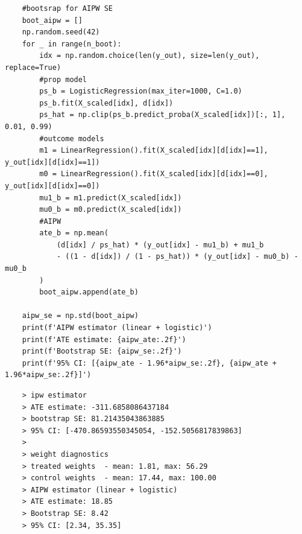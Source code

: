 \documentclass[10pt]{article}
\begin{document}
\begin{lstlisting}
    #bootsrap for AIPW SE 
    boot_aipw = []
    np.random.seed(42)
    for _ in range(n_boot):
        idx = np.random.choice(len(y_out), size=len(y_out), replace=True)
        #prop model
        ps_b = LogisticRegression(max_iter=1000, C=1.0)
        ps_b.fit(X_scaled[idx], d[idx])
        ps_hat = np.clip(ps_b.predict_proba(X_scaled[idx])[:, 1], 0.01, 0.99)
        #outcome models
        m1 = LinearRegression().fit(X_scaled[idx][d[idx]==1], y_out[idx][d[idx]==1])
        m0 = LinearRegression().fit(X_scaled[idx][d[idx]==0], y_out[idx][d[idx]==0])
        mu1_b = m1.predict(X_scaled[idx])
        mu0_b = m0.predict(X_scaled[idx])
        #AIPW
        ate_b = np.mean(
            (d[idx] / ps_hat) * (y_out[idx] - mu1_b) + mu1_b
            - ((1 - d[idx]) / (1 - ps_hat)) * (y_out[idx] - mu0_b) - mu0_b
        )
        boot_aipw.append(ate_b)

    aipw_se = np.std(boot_aipw)
    print(f'AIPW estimator (linear + logistic)')
    print(f'ATE estimate: {aipw_ate:.2f}')
    print(f'Bootstrap SE: {aipw_se:.2f}')
    print(f'95% CI: [{aipw_ate - 1.96*aipw_se:.2f}, {aipw_ate + 1.96*aipw_se:.2f}]')
\end{lstlisting}
\begin{verbatim}
    > ipw estimator
    > ATE estimate: -311.6858086437184
    > bootstrap SE: 81.21435043863885
    > 95% CI: [-470.86593550345054, -152.5056817839863]
    > 
    > weight diagnostics
    > treated weights  - mean: 1.81, max: 56.29
    > control weights  - mean: 17.44, max: 100.00
    > AIPW estimator (linear + logistic)
    > ATE estimate: 18.85
    > Bootstrap SE: 8.42
    > 95% CI: [2.34, 35.35]
\end{verbatim}
\end{document}
